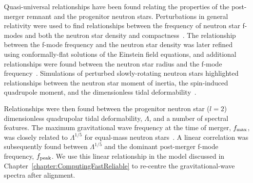 \documentclass[../Thesis.tex]{subfiles}
\begin{document}


    Quasi-universal relationships have been found relating the properties of the post-merger remnant and the progenitor neutron stars. 
    Perturbations in general relativity were used to find relationships between the frequency of neutron star f-modes and both the neutron star density and compactness~\cite{Andersson1998b}.
    The relationship between the f-mode frequency and the neutron star density was later refined using conformally-flat solutions of the Einstein field equations, and additional relationships were found between the neutron star radius and the f-mode frequency~\cite{Bauswein2012,Bauswein2012a}.
    Simulations of perturbed slowly-rotating neutron stars highlighted relationships between the neutron star moment of inertia, the spin-induced quadrupole moment, and the dimensionless tidal deformability~\cite{Yagi2013,Yagi2013a}. \par


    Relationships were then found between the progenitor neutron star ($l=2$) dimensionless quadrupolar tidal deformability, $\Lambda$, and a number of spectral features.
    The maximum gravitational wave frequency at the time of merger, $f_{\mathrm{max}}$, was closely related to $\Lambda^{1/5}$ for equal-mass neutron stars~\cite{Read2013}.
    A linear correlation was subsequently found between $\Lambda^{1/5}$ and the dominant post-merger f-mode frequency, $f_{\mathrm{peak}}$.
    We use this linear relationship in the model discussed in Chapter~\ref{chapter:ComputingFastReliable} to re-centre the gravitational-wave spectra after alignment.


    
    

    
    
    
\end{document}
